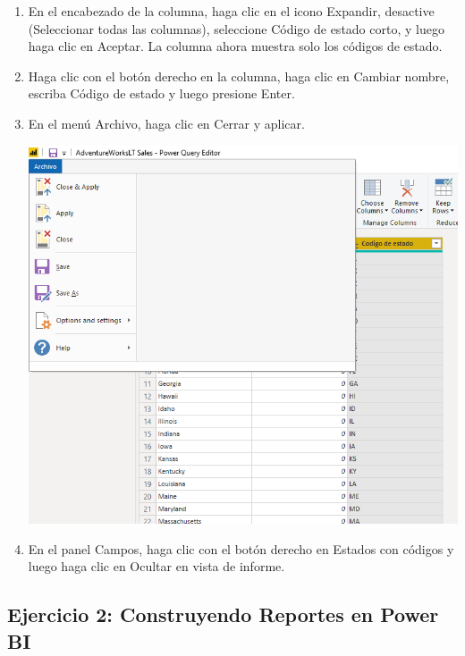 \begin{enumerate}
    \item En el encabezado de la columna, haga clic en el icono Expandir, desactive (Seleccionar todas las columnas), seleccione Código de estado corto, y luego haga clic en Aceptar. La columna ahora muestra solo los códigos de estado.
    
     
    \item Haga clic con el botón derecho en la columna, haga clic en Cambiar nombre, escriba Código de estado y luego presione Enter.
    
    \item En el menú Archivo, haga clic en Cerrar y aplicar.
    
        \begin{center}
	\includegraphics[width=13cm]{./Imagenes/11}
	\end{center}
    
    \item En el panel Campos, haga clic con el botón derecho en Estados con códigos y luego haga clic en Ocultar en vista de informe.
 

    

\end{enumerate}




\subsection{Ejercicio 2:  Construyendo Reportes en Power BI}\\

